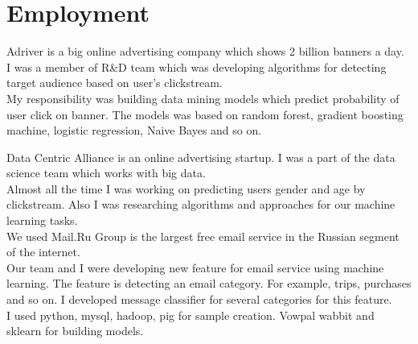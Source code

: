 \documentclass[11pt,a4paper]{moderncv-xetex}
\begin{document}
\maketitle

\section{Employment}
 \newline
    {
    Adriver is a big online advertising company which shows 2 billion banners a day. I was a member of R\&D team which was developing algorithms for detecting target audience based on user's clickstream. \\ 
    My responsibility was building data mining models which predict probability of user click on banner. The models was based on random forest, gradient boosting machine, logistic regression, Naive Bayes and so on.  
       }
    

 \newline
    {
     Data Centric Alliance is an online advertising startup. I was a part of the data science team which works with big data. \\ 
     Almost all the time I was working  on predicting users gender and age  by clickstream. Also I was researching algorithms and approaches for our machine learning tasks. \\ 
      \vfill
      We used
    }
     \newline
    {
   Mail.Ru Group is the largest free email service in the Russian segment of the internet.  \\
   Our team and I were developing new feature for email service using machine learning.
   The feature is detecting an email category. For example, trips, purchases and so on. I developed message classifier for several categories for this feature. \\
   \vfill
   I used python, mysql, hadoop, pig for sample creation.  Vowpal wabbit and sklearn for building models. }

\end{document}

